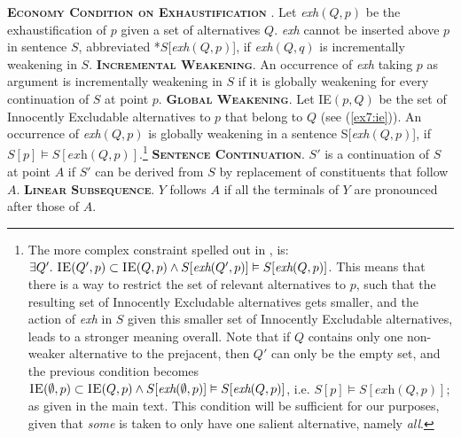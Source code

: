 \begin{exe}
	\ex\label{ex7:economy} {\textsc{\textbf{Economy Condition on Exhaustification}} \parencite{Fox2018a}. Let \textit{exh}$(Q, p)$ be the exhaustification of $p$ given a set of alternatives $Q$. \textit{exh} cannot be inserted above $p$ in sentence $S$, abbreviated *$S$[\textit{exh}$(Q, p)$], if \textit{exh}$(Q, q)$ is incrementally weakening in $S$.}
	\ex\label{ex7:economy-incr-wk} {\textsc{\textbf{Incremental Weakening}}. An occurrence of \textit{exh} taking $p$ as argument is incrementally weakening in $S$ if it is globally weakening for every continuation of $S$ at point $p$.}
	\ex\label{ex7:economy-gl-wk} {\textsc{\textbf{Global Weakening}}. Let \textsc{IE}$(p, Q)$ be the set of Innocently Excludable alternatives to $p$ that belong to $Q$ (see (\ref{ex7:ie})). An occurrence of \textit{exh}$(Q, p)$ is globally weakening in a sentence S[\textit{exh}$(Q, p)$], if $S[p] \vDash S[\textit{exh}(Q, p)]$.\footnote{The more complex constraint spelled out in \textcite{Fox2018a}, is: $\exists Q'. \ \textsc{IE}(Q', p) \subset \textsc{IE}(Q, p) \wedge S[\textit{exh}(Q', p)] \vDash S[\textit{exh}(Q, p)]$. This means that there is a way to restrict the set of relevant alternatives to $p$, such that the resulting set of Innocently Excludable alternatives gets smaller, and the action of \textit{exh} in $S$ given this smaller set of Innocently Excludable alternatives, leads to a stronger meaning overall. Note that if $Q$ contains only one non-weaker alternative to the prejacent, then $Q'$ can only be the empty set, and the previous condition becomes $\textsc{IE}(\emptyset, p) \subset \textsc{IE}(Q, p) \wedge S[\textit{exh}(\emptyset, p)] \vDash S[\textit{exh}(Q, p)]$, i.e. $S[p] \vDash S[\textit{exh}(Q, p)]$; as given in the main text. This condition will be sufficient for our purposes, given that \textit{some} is taken to only have one salient alternative, namely \textit{all}.}}
	\ex\label{ex7:economy-cont} {\textsc{\textbf{Sentence Continuation}}. $S'$ is a continuation of $S$ at point $A$ if $S'$ can be derived from $S$ by replacement of constituents that follow $A$.}
	\ex\label{ex7:economy-prec} {\textsc{\textbf{Linear Subsequence}}. $Y$ follows $A$ if all the terminals of $Y$ are pronounced after those of $A$.}
\end{exe}
%
